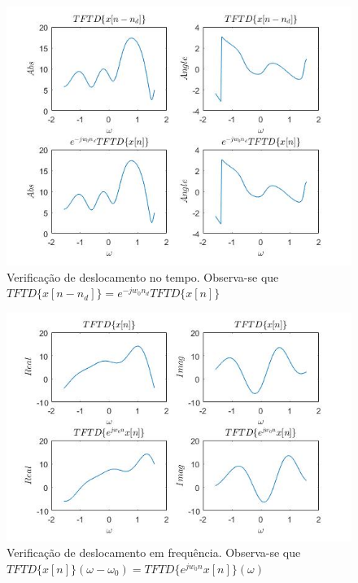 \documentclass[a4paper, 12pt]{article}
\begin{document}
\begin{figure}[H]
	\centering
	\includegraphics[scale=0.7]{img4.jpg} 
	\caption{Verificação de deslocamento no tempo. Observa-se que $TFTD \lbrace x[n-n_d]\rbrace = e^{-jw_0n_d}TFTD \lbrace x[n]\rbrace$}
	\label{fig:4}
\end{figure}

\begin{figure}[H]
	\centering
	\includegraphics[scale=0.7]{img5.jpg} 
	\caption{Verificação de deslocamento em frequência. Observa-se que $TFTD \lbrace x[n]\rbrace (\omega - \omega_0 ) = TFTD \lbrace e^{jw_0n}x[n]\rbrace (\omega )$}
	\label{fig:5}
\end{figure}
\end{document}
